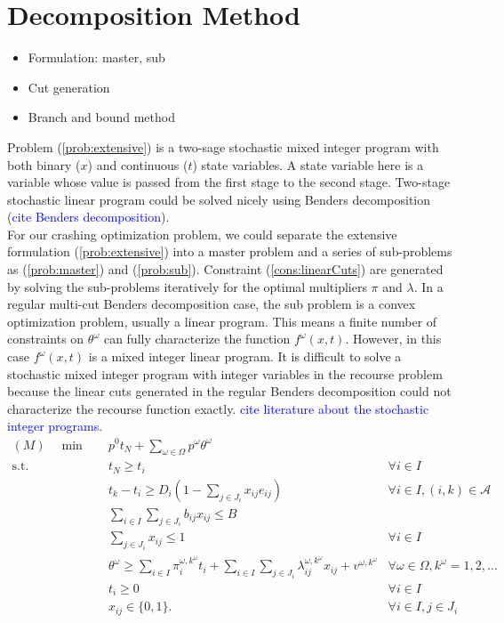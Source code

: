 \documentclass[11pt]{article}
\begin{document}
\section{Decomposition Method} \label{sec:decomposition}
	\begin{itemize}
		\item Formulation: master, sub
		\item Cut generation
		\item Branch and bound method
	\end{itemize}
	Problem (\ref{prob:extensive}) is a two-sage stochastic mixed integer program with both binary (\(x\)) and continuous (\(t\)) state variables. A state variable here is a variable whose value is passed from the first stage to the second stage. Two-stage stochastic linear program could be solved nicely using Benders decomposition (\textcolor{blue}{cite Benders decomposition}). \\
	\newline 
	For our crashing optimization problem, we could separate the extensive formulation (\ref{prob:extensive}) into a master problem and a series of sub-problems as (\ref{prob:master}) and (\ref{prob:sub}). Constraint (\ref{cons:linearCuts}) are generated by solving the sub-problems iteratively for the optimal multipliers \(\pi\) and \(\lambda\). In a regular multi-cut Benders decomposition case, the sub problem is a convex optimization problem, usually a linear program. This means a finite number of constraints on \(\theta^\omega\) can fully characterize the function \(f^\omega(x,t)\). However, in this case \(f^\omega(x,t)\) is a mixed integer linear program. It is difficult to solve a stochastic mixed integer program with integer variables in the recourse problem because the linear cuts generated in the regular Benders decomposition could not characterize the recourse function exactly. \textcolor{blue}{cite literature about the stochastic integer programs}.
	\begin{subequations}
		\label{prob:master}
		\begin{align}
		(M) \quad \min \quad & p^0 t_N + \sum_{\omega \in \Omega} p^\omega \theta^\omega & \\
		\text{s.t.} \quad & t_N \geq t_i & \forall i \in I\\
		& t_k - t_i \geq D_{i}(1 - \sum_{j \in J_i} x_{ij} e_{ij}) & \forall i \in I, (i,k) \in \mathcal{A}\\
		& \sum_{i \in I} \sum_{j \in J_i} b_{ij}x_{ij} \leq B & \\
		& \sum_{j \in J_i} x_{ij} \leq 1 & \forall i \in I\\
		& \theta^\omega \geq \sum_{i \in I} \pi_i^{\omega,k^\omega} t_i + \sum_{i \in I} \sum_{j \in J_i} \lambda_{ij}^{\omega,k^\omega} x_{ij} + v^{\omega,k^\omega} & \forall \omega \in \Omega, k^\omega = 1,2, \dots \label{cons:linearCuts}\\
		& t_i \geq 0 & \forall i \in I\\
		& x_{ij} \in \{0,1\}. & \forall i \in I, j \in J_i&
		\end{align}
	\end{subequations}
\end{document}
